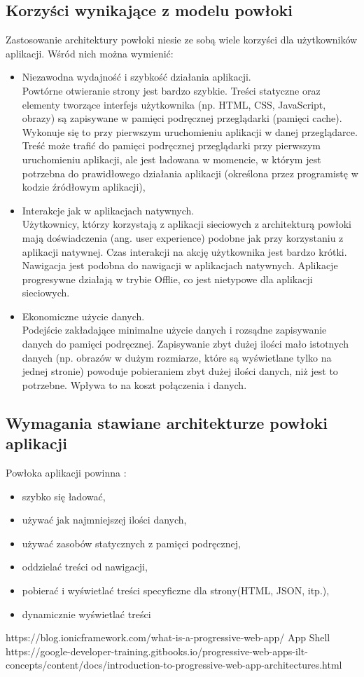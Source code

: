 \documentclass[a4paper,12pt,twoside,openany]{report}
\begin{document}
\subsection*{Korzy\'sci wynikające z modelu powłoki}
\noindent Zastosowanie architektury powłoki niesie ze sobą wiele korzy\'sci dla użytkowników aplikacji. W\'sród nich można wymienić:
\begin{itemize}
\item{Niezawodna wydajno\'sć i szybko\'sć działania aplikacji.\\ Powtórne otwieranie strony jest bardzo szybkie. Tre\'sci statyczne oraz elementy tworzące interfejs użytkownika (np. HTML, CSS, JavaScript, obrazy) są zapisywane w pamięci podręcznej przeglądarki (pamięci cache). Wykonuje się to przy pierwszym uruchomieniu aplikacji w danej przeglądarce. Tre\'sć może trafić do pamięci podręcznej przeglądarki przy pierwszym uruchomieniu aplikacji, ale jest ładowana w momencie, w którym jest potrzebna do prawidłowego działania aplikacji (okre\'slona przez programistę w kodzie źródłowym aplikacji),}
\item{Interakcje jak w aplikacjach natywnych.}\\ Użytkownicy, którzy korzystają z aplikacji sieciowych z architekturą powłoki mają do\'swiadczenia (ang. user experience) podobne jak przy korzystaniu z aplikacji natywnej. Czas interakcji na akcję użytkownika jest bardzo krótki. Nawigacja jest podobna do nawigacji w aplikacjach natywnych. Aplikacje progresywne działają w trybie Offlie, co jest nietypowe dla aplikacji sieciowych.
\item{Ekonomiczne użycie danych. \\Podej\'scie zakładające minimalne użycie danych i rozsądne zapisywanie danych do pamięci podręcznej. Zapisywanie zbyt dużej ilo\'sci mało istotnych danych (np. obrazów w dużym rozmiarze, które są wy\'swietlane tylko na jednej stronie) powoduje pobieraniem zbyt dużej ilo\'sci danych, niż jest to potrzebne. Wpływa to na koszt połączenia i danych. }
\end{itemize}

\subsection*{Wymagania stawiane architekturze powłoki aplikacji}
 Powłoka aplikacji powinna \cite{shell}:
\begin{itemize}
\item{szybko się ładować,}
\item{używać jak najmniejszej ilo\'sci danych,}
\item{używać zasobów statycznych z pamięci podręcznej,}
\item{oddzielać tre\'sci od nawigacji,}
\item{pobierać i wy\'swietlać tre\'sci specyficzne dla strony(HTML, JSON, itp.),}
\item{dynamicznie wy\'swietlać tre\'sci}
\end{itemize}
https://blog.ionicframework.com/what-is-a-progressive-web-app/ App Shell
https://google-developer-training.gitbooks.io/progressive-web-apps-ilt-concepts/content/docs/introduction-to-progressive-web-app-architectures.html
\end{document}
